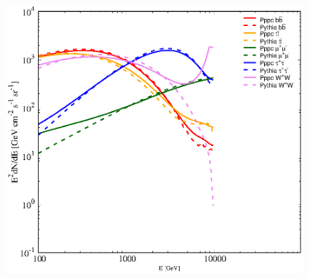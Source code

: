 \documentclass[aps,prd,amsmath,amssymb,showpacs,floats,floatfix,nofootinbib,reprint]{revtex4-1}
\begin{document}

\begin{figure}
\includegraphics[scale=0.8]{dnde}
\end{figure}
\end{document}
